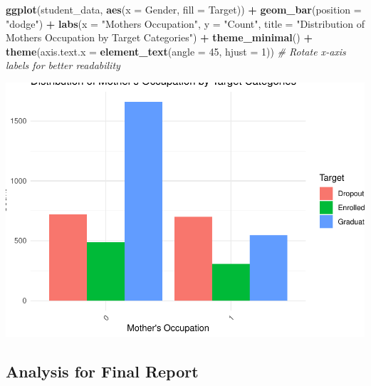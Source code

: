 \documentclass[
]{article}
\newenvironment{Shaded}{\begin{snugshade}}{\end{snugshade}}
\newcommand{\AttributeTok}[1]{\textcolor[rgb]{0.13,0.29,0.53}{#1}}
\newcommand{\CommentTok}[1]{\textcolor[rgb]{0.56,0.35,0.01}{\textit{#1}}}
\newcommand{\DecValTok}[1]{\textcolor[rgb]{0.00,0.00,0.81}{#1}}
\newcommand{\FunctionTok}[1]{\textcolor[rgb]{0.13,0.29,0.53}{\textbf{#1}}}
\newcommand{\NormalTok}[1]{#1}
\newcommand{\SpecialCharTok}[1]{\textcolor[rgb]{0.81,0.36,0.00}{\textbf{#1}}}
\newcommand{\StringTok}[1]{\textcolor[rgb]{0.31,0.60,0.02}{#1}}
\begin{document}
\begin{Shaded}
\begin{Highlighting}[]
\FunctionTok{ggplot}\NormalTok{(student\_data, }\FunctionTok{aes}\NormalTok{(}\AttributeTok{x =} \StringTok{\textasciigrave{}}\AttributeTok{Gender}\StringTok{\textasciigrave{}}\NormalTok{, }\AttributeTok{fill =}\NormalTok{ Target)) }\SpecialCharTok{+}
  \FunctionTok{geom\_bar}\NormalTok{(}\AttributeTok{position =} \StringTok{"dodge"}\NormalTok{) }\SpecialCharTok{+}
  \FunctionTok{labs}\NormalTok{(}\AttributeTok{x =} \StringTok{"Mother\textquotesingle{}s Occupation"}\NormalTok{, }\AttributeTok{y =} \StringTok{"Count"}\NormalTok{, }\AttributeTok{title =} \StringTok{"Distribution of Mother\textquotesingle{}s Occupation by Target Categories"}\NormalTok{) }\SpecialCharTok{+}
  \FunctionTok{theme\_minimal}\NormalTok{() }\SpecialCharTok{+}
  \FunctionTok{theme}\NormalTok{(}\AttributeTok{axis.text.x =} \FunctionTok{element\_text}\NormalTok{(}\AttributeTok{angle =} \DecValTok{45}\NormalTok{, }\AttributeTok{hjust =} \DecValTok{1}\NormalTok{))  }\CommentTok{\# Rotate x{-}axis labels for better readability}
\end{Highlighting}
\end{Shaded}

\includegraphics{exploratory_data_analysis_files/figure-latex/unnamed-chunk-26-1.pdf}

\hypertarget{analysis-for-final-report}{%
\subsection{Analysis for Final Report}\label{analysis-for-final-report}}
\end{document}
